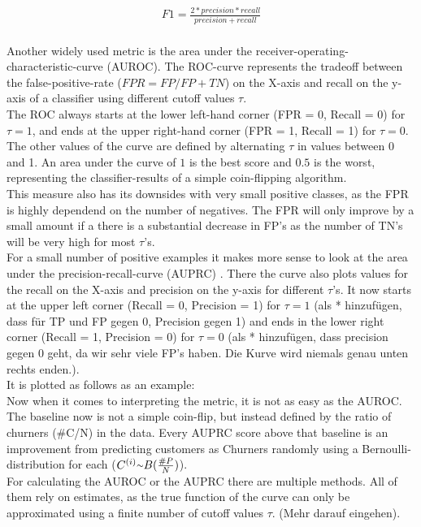 \documentclass[12pt,titlepage]{article}
\begin{document}
\begin{equation} \label{f1}
    \begin{aligned}
        F1 = \frac{2*precision*recall}{precision+recall} \\
    \end{aligned}
\end{equation}

Another widely used metric is the area under the receiver-operating-characteristic-curve (AUROC). The ROC-curve represents the tradeoff between the false-positive-rate ($FPR=FP/FP+TN$) on the X-axis and recall on the y-axis of a classifier using different cutoff values $\tau$. \\
The ROC always starts at the lower left-hand corner (FPR = 0, Recall = 0) for $\tau=1$, and ends at the upper right-hand corner (FPR = 1, Recall = 1) for $\tau=0$. The other values of the curve are defined by alternating $\tau$ in values between 0 and 1. An area under the curve of $1$ is the best score and $0.5$ is the worst, representing the classifier-results of a simple coin-flipping algorithm. \\
This measure also has its downsides with very small positive classes, as the FPR is highly dependend on the number of negatives. The FPR will only improve by a small amount if a there is a substantial decrease in FP's as the number of TN's will be very high for most $\tau$'s. \\
For a small number of positive examples it makes more sense to look at the area under the precision-recall-curve (AUPRC) \cite{auprc}. There the curve also plots values for the recall on the X-axis and precision on the y-axis for different $\tau$'s. It now starts at the upper left corner (Recall = 0, Precision = 1) for $\tau=1$ (als * hinzufügen, dass für TP und FP gegen 0, Precision gegen 1) and ends in the lower right corner (Recall = 1, Precision = 0) for $\tau=0$ (als * hinzufügen, dass precision gegen 0 geht, da wir sehr viele FP's haben. Die Kurve wird niemals genau unten rechts enden.). \\
It is plotted as follows as an example:\\
Now when it comes to interpreting the metric, it is not as easy as the AUROC. The baseline now is not a simple coin-flip, but instead defined by the ratio of churners (\#C/N) in the data. Every AUPRC score above that baseline is an improvement from predicting customers as Churners randomly using a Bernoulli-distribution for each ($C^{(i)}{\raise.17ex\hbox{$\scriptstyle\mathtt{\sim}$}} B(\frac{\#P}{N})$). \\
For calculating the AUROC or the AUPRC there are multiple methods. All of them rely on estimates, as the true function of the curve can only be approximated using a finite number of cutoff values $\tau$. (Mehr darauf eingehen). \\
\end{document}
